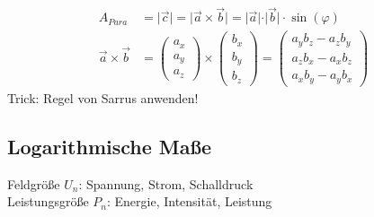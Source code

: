     \begingroup
        \renewcommand*{\arraystretch}{.95}
        \begin{align*}
        A_{Para} & = \vert \vec{c} \vert = \vert \vec{a} \times \vec{b} \vert = \vert \vec{a} \vert \cdot \vert \vec{b} \vert \cdot \sin(\varphi)\\
        \vec{a}\times\vec{b} & =
                \begin{pmatrix}
                    a_x \\
                    a_y \\
                    a_z
                \end{pmatrix}
                \times
                \begin{pmatrix}
                    b_x \\
                    b_y \\
                    b_z
                \end{pmatrix} =
                \begin{pmatrix}
                    a_yb_z-a_zb_y \\
                    a_zb_x-a_xb_z \\
                    a_xb_y-a_yb_x
                \end{pmatrix}
            \end{align*}
    \endgroup
    Trick: Regel von Sarrus anwenden!


    \subsection{Logarithmische Maße}
    Feldgröße $U_n$: Spannung, Strom, Schalldruck \\
    Leistungsgröße $P_n$: Energie, Intensität, Leistung

